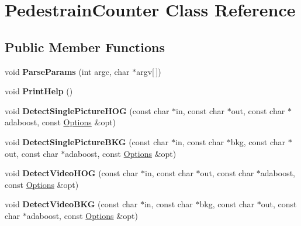 \hypertarget{classPedestrainCounter}{}\section{Pedestrain\+Counter Class Reference}
\label{classPedestrainCounter}
\subsection*{Public Member Functions}
\begin{DoxyCompactItemize}
\item 
\hypertarget{classPedestrainCounter_a3ee9040e35577fd816f096cb9bb3869c}{}void {\bfseries Parse\+Params} (int argc, char $\ast$argv\mbox{[}$\,$\mbox{]})\label{classPedestrainCounter_a3ee9040e35577fd816f096cb9bb3869c}

\item 
\hypertarget{classPedestrainCounter_a138d566c8f5943c8135c47e199d016f2}{}void {\bfseries Print\+Help} ()\label{classPedestrainCounter_a138d566c8f5943c8135c47e199d016f2}

\item 
\hypertarget{classPedestrainCounter_a0f593589d34e74c6f3991682c3054db3}{}void {\bfseries Detect\+Single\+Picture\+H\+O\+G} (const char $\ast$in, const char $\ast$out, const char $\ast$adaboost, const \hyperlink{structOptions}{Options} \&opt)\label{classPedestrainCounter_a0f593589d34e74c6f3991682c3054db3}

\item 
\hypertarget{classPedestrainCounter_a630d50a4715e0f47931d8794f423d3b3}{}void {\bfseries Detect\+Single\+Picture\+B\+K\+G} (const char $\ast$in, const char $\ast$bkg, const char $\ast$out, const char $\ast$adaboost, const \hyperlink{structOptions}{Options} \&opt)\label{classPedestrainCounter_a630d50a4715e0f47931d8794f423d3b3}

\item 
\hypertarget{classPedestrainCounter_ae502bc7eeb2736937c5d38b65324b30c}{}void {\bfseries Detect\+Video\+H\+O\+G} (const char $\ast$in, const char $\ast$out, const char $\ast$adaboost, const \hyperlink{structOptions}{Options} \&opt)\label{classPedestrainCounter_ae502bc7eeb2736937c5d38b65324b30c}

\item 
\hypertarget{classPedestrainCounter_ac43f168c66a04fe5a34e138a87bc6e83}{}void {\bfseries Detect\+Video\+B\+K\+G} (const char $\ast$in, const char $\ast$bkg, const char $\ast$out, const char $\ast$adaboost, const \hyperlink{structOptions}{Options} \&opt)\label{classPedestrainCounter_ac43f168c66a04fe5a34e138a87bc6e83}


\end{DoxyCompactItemize}
